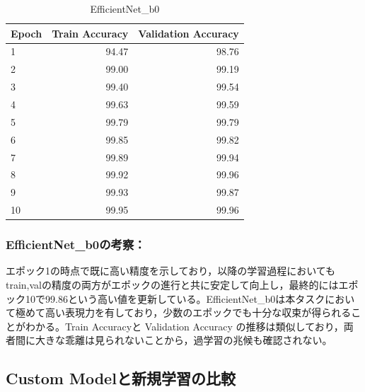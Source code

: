 \documentclass[a4paper,11pt,titlepage]{jsarticle}
\begin{document}
\begin{table}[H]
\centering
\caption{EfficientNet\_b0}
\label{tab:efficientnet}
\begin{tabular}{lrr}
\hline
 Epoch &  Train Accuracy &  Validation Accuracy \\
\hline
     1 &           94.47 &                98.76 \\
     2 &           99.00 &                99.19 \\
     3 &           99.40 &                99.54 \\
     4 &           99.63 &                99.59 \\
     5 &           99.79 &                99.79 \\
     6 &           99.85 &                99.82 \\
     7 &           99.89 &                99.94 \\
     8 &           99.92 &                99.96 \\
     9 &           99.93 &                99.87 \\
    10 &           99.95 &                99.96 \\
\hline
\end{tabular}
\end{table}


\subsubsection*{EfficientNet\_b0の考察：}
エポック1の時点で既に高い精度を示しており，以降の学習過程においてもtrain,valの精度の両方がエポックの進行と共に安定して向上し，最終的にはエポック10で99.86という高い値を更新している。EfficientNet\_b0は本タスクにおいて極めて高い表現力を有しており，少数のエポックでも十分な収束が得られることがわかる。Train Accuracyと Validation Accuracy の推移は類似しており，両者間に大きな乖離は見られないことから，過学習の兆候も確認されない。


\subsection{Custom Modelと新規学習の比較}


  
\end{document}
